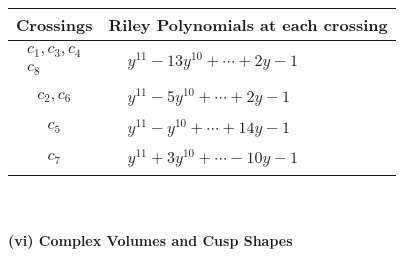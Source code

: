 \documentclass[1p]{elsarticle_modified}
\theoremstyle{definition}
\begin{document}
\begin{tabular}{m{50pt}|m{274pt}}
Crossings & \hspace{64pt}Riley Polynomials at each crossing \\
\hline $$\begin{aligned}c_{1},c_{3},c_{4}\\c_{8}\end{aligned}$$&$\begin{aligned}
&y^{11}-13 y^{10}+\cdots+2 y-1
\end{aligned}$\\
\hline $$\begin{aligned}c_{2},c_{6}\end{aligned}$$&$\begin{aligned}
&y^{11}-5 y^{10}+\cdots+2 y-1
\end{aligned}$\\
\hline $$\begin{aligned}c_{5}\end{aligned}$$&$\begin{aligned}
&y^{11}- y^{10}+\cdots+14 y-1
\end{aligned}$\\
\hline $$\begin{aligned}c_{7}\end{aligned}$$&$\begin{aligned}
&y^{11}+3 y^{10}+\cdots-10 y-1
\end{aligned}$\\
\hline
\end{tabular}\\~\\
\newpage\flushleft \textbf{(vi) Complex Volumes and Cusp Shapes}
\end{document}
